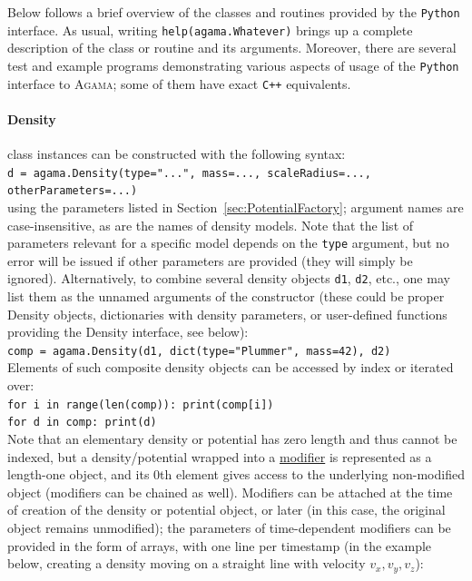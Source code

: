 \documentclass[12pt]{article}
\newcommand{\Agama}{\textsc{Agama}\xspace}
\newcommand{\Cpp}  {\texttt{C++}\xspace}
\newcommand{\Python}{\texttt{Python}\xspace}
\begin{document}
Below follows a brief overview of the classes and routines provided by the \Python interface.
As usual, writing \texttt{help(agama.Whatever)} brings up a complete description of the class or routine and its arguments. Moreover, there are several test and example programs demonstrating various aspects of usage of the \Python interface to \Agama; some of them have exact \Cpp equivalents.

\paragraph{Density} class instances can be constructed with the following syntax: \\
\texttt{d = agama.Density(type="...", mass=..., scaleRadius=..., otherParameters=...)}\\
using the parameters listed in Section~\ref{sec:PotentialFactory}; argument names are case-insensitive, as are the names of density models. Note that the list of parameters relevant for a specific model depends on the \texttt{type} argument, but no error will be issued if other parameters are provided (they will simply be ignored).
Alternatively, to combine several density objects \texttt{d1}, \texttt{d2}, etc., one may list them as the unnamed arguments of the constructor (these could be proper Density objects, dictionaries with density parameters, or user-defined functions providing the Density interface, see below):\\
\texttt{comp = agama.Density(d1, dict(type="Plummer", mass=42), d2)}\\[2mm]
Elements of such composite density objects can be accessed by index or iterated over:\\
\texttt{for i in range(len(comp)): print(comp[i])}\\
\texttt{for d in comp: print(d)}\\[2mm]
Note that an elementary density or potential has zero length and thus cannot be indexed, but a density/potential wrapped into a \hyperref[sec:PotentialModifiers]{modifier} is represented as a length-one object, and its 0th element gives access to the underlying non-modified object (modifiers can be chained as well). Modifiers can be attached at the time of creation of the density or potential object, or later (in this case, the original object remains unmodified); the parameters of time-dependent modifiers can be provided in the form of arrays, with one line per timestamp (in the example below, creating a density moving on a straight line with velocity $v_x,v_y,v_z$):\\
\end{document}
